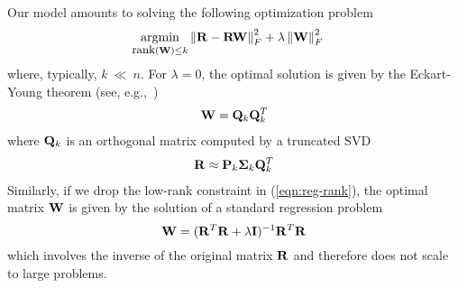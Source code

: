 Our model amounts to solving the following optimization problem
 \begin{align}
\label{eqn:reg-rank}
\underset{\mbox{\footnotesize rank}(\W) \le k}{\mathrm{argmin}} & \left \| \R - \R\W\right \|_F^2 + \lambda \left \|  \W \right \|_F^2
\end{align}
where, typically, $k\ \ll \ n$.
For $\lambda = 0$, the optimal solution is given by the Eckart-Young theorem (see, e.g.,~\citep{halko2011})
   \begin{align}
   \label{eqn:SVDOptimal}
   \mathbf{W} = \mathbf{Q}_k \mathbf{Q}_k^ T
   \end{align}
where  $\mathbf{Q}_k$ is an orthogonal matrix computed by a truncated SVD 
   \begin{align*}
   \mathbf{R} \approx \mathbf{P}_k \mathbf{\Sigma}_k \mathbf{Q}_k^T
   \end{align*}
Similarly, if we drop the low-rank constraint in (\ref{eqn:reg-rank}), the optimal matrix $\mathbf{W}$ is given by the solution of a standard regression problem 
\begin{equation}
\mathbf{W} = (\mathbf{R}^T \mathbf{R} + \lambda \mathbf{I})^{-1} \mathbf{R}^T \mathbf{R}
\end{equation}
which involves the inverse of the original matrix $\mathbf{R}$ and therefore does not scale to large problems.

